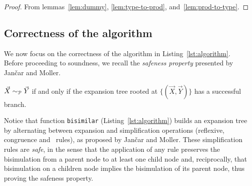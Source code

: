 \begin{proof}
  From lemmas~\ref{lem:dummy}, \ref{lem:type-to-prod}, and~\ref{lem:prod-to-type}.
\end{proof}






\subsection{Correctness of the algorithm}


We now focus on the correctness of the algorithm in
Listing~\ref{lst:algorithm}.  Before proceeding to soundness, we
recall the \emph{safeness property} presented by Jan{\v{c}}ar and
Moller.

\begin{proposition} 
  \label{prop:safeness}
  $\vec X \sim_\mathcal P \vec Y$ if and only if the expansion tree rooted
  at $\{(\vec X, \vec Y)\}$ has a successful branch.
\end{proposition}

Notice that function \lstinline|bisimilar|
(Listing~\ref{lst:algorithm}) builds an expansion tree by alternating
between expansion and simplification operations (reflexive,
congruence and \BPA\ rules), as proposed by Jan{\v{c}}ar and Moller.
%
These simplification rules are \emph{safe}, in the sense that the
application of any rule preserves the bisimulation from a parent node
to at least one child node and, reciprocally, that bisimulation on a
children node implies the bisimulation of its parent node, thus proving
the safeness property.


